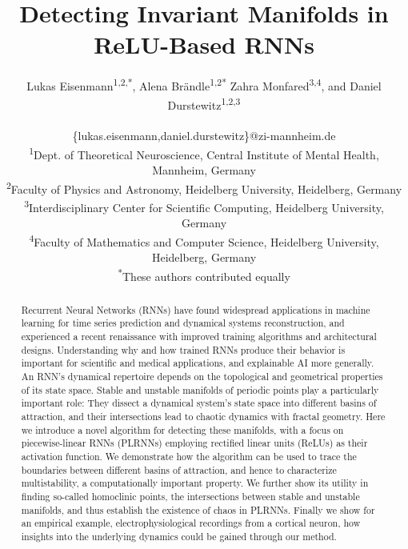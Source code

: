 \documentclass{article}
\theoremstyle{example}
\theoremstyle{plain}
\theoremstyle{definition}
\theoremstyle{remark}
\begin{document}
\title{Detecting Invariant Manifolds in ReLU-Based RNNs}
\author{%
  Lukas Eisenmann\textsuperscript{1,2,*}, Alena Brändle\textsuperscript{1,2*} Zahra Monfared\textsuperscript{3,4}, and Daniel Durstewitz\textsuperscript{1,2,3} \\ \\
  \{lukas.eisenmann,daniel.durstewitz\}@zi-mannheim.de\\
  \textsuperscript{1}Dept. of Theoretical Neuroscience, Central Institute of Mental Health, Mannheim, Germany \\\textsuperscript{2}Faculty of Physics and Astronomy, Heidelberg University, Heidelberg, Germany\\ 
\textsuperscript{3}Interdisciplinary Center for Scientific Computing, Heidelberg University, Germany\\ 
\textsuperscript{4}Faculty of Mathematics and Computer Science, Heidelberg University, Heidelberg, Germany\\
%
\textsuperscript{*}These authors contributed equally\\}
\maketitle
\begin{abstract}
Recurrent Neural Networks (RNNs) have found widespread applications in machine learning for time series prediction and dynamical systems reconstruction, and experienced a recent renaissance with improved training algorithms and architectural designs. Understanding why and how trained RNNs produce their behavior is important for scientific and medical applications, and explainable AI more generally. An RNN's dynamical repertoire depends on the topological and geometrical properties of its state space. Stable and unstable manifolds of periodic points play a particularly important role: They dissect a dynamical system's state space into different basins of attraction, and their intersections lead to %
chaotic dynamics with fractal geometry. Here we introduce a %
novel algorithm for detecting these manifolds, with a focus on piecewise-linear RNNs (PLRNNs) employing rectified linear units (ReLUs) as their activation function. We demonstrate how the algorithm can be used to trace the boundaries between different basins of attraction, and hence to characterize multistability, a computationally important property. We further show its utility in finding so-called homoclinic points, the intersections between stable and unstable manifolds, and thus establish the existence of chaos in PLRNNs. Finally we show for an empirical example, electrophysiological recordings from a cortical neuron, how insights into the underlying dynamics could be gained through our method.
\end{abstract}
\end{document}
